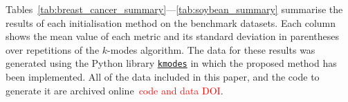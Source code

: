 Tables~\ref{tab:breast_cancer_summary}---\ref{tab:soybean_summary} summarise the
results of each initialisation method on the benchmark datasets. Each column
shows the mean value of each metric and its standard deviation in parentheses
over repetitions of the \(k\)-modes algorithm. The
data for these results was generated using the Python library
\href{https://github.com/nicodv/kmodes}{\texttt{kmodes}} in which the proposed
method has been implemented. All of the data included in this paper, and the
code to generate it are archived online~\textcolor{red}{code and data DOI}.

\begin{table}
    \centering
    \resizebox{\textwidth}{!}{%
        
    }
    \label{tab:breast_cancer_summary}\vspace{20pt}

    \resizebox{\textwidth}{!}{%
        
    }
    \label{tab:mushroom_summary}\vspace{20pt}

    \resizebox{\textwidth}{!}{%
        
    }
    \label{tab:soybean_summary}\vspace{20pt}

\end{table}
